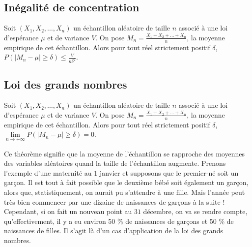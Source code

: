 	\subsection{Inégalité de concentration}

	\begin{formula}
		Soit $(X_1, X_2, \dots, X_n)$ un échantillon aléatoire de taille $n$ associé à une loi d'espérance $\mu$ et de variance $V$. On pose $M_n = \frac{X_1 + X_2 + \dots + X_n}{n}$, la moyenne empirique de cet échantillon.
		\newpar
		Alors pour tout réel strictement positif $\delta$, $P(|M_n - \mu| \geq \delta) \leq \frac{V}{n \delta^2}$.
	\end{formula}

	\subsection{Loi des grands nombres}

	\begin{formula}
		Soit $(X_1, X_2, \dots, X_n)$ un échantillon aléatoire de taille $n$ associé à une loi d'espérance $\mu$ et de variance $V$. On pose $M_n = \frac{X_1 + X_2 + \dots + X_n}{n}$, la moyenne empirique de cet échantillon.
		\newpar
		Alors pour tout réel strictement positif $\delta$, $\lim\limits_{n \rightarrow +\infty} P(|M_n - \mu| \geq \delta) = 0$.
	\end{formula}

	\begin{tip}
		Ce théorème signifie que la moyenne de l'échantillon se rapproche des moyennes des variables aléatoires quand la taille de l'échantillon augmente.
		\newpar
		Prenons l'exemple d'une maternité au 1\ier{} janvier et supposons que le premier-né soit un garçon. Il est tout à fait possible que le deuxième bébé soit également un garçon, alors que, statistiquement, on aurait pu s'attendre à une fille.
		\newpar
		Mais l'année peut très bien commencer par une dizaine de naissances de garçons à la suite !
		\newpar
		Cependant, si on fait un nouveau point au $31$ décembre, on va se rendre compte, qu'effectivement, il y a eu environ 50 \% de naissances de garçons et 50 \% de naissances de filles. Il s'agit là d'un cas d'application de la loi des grands nombres.
	\end{tip}

